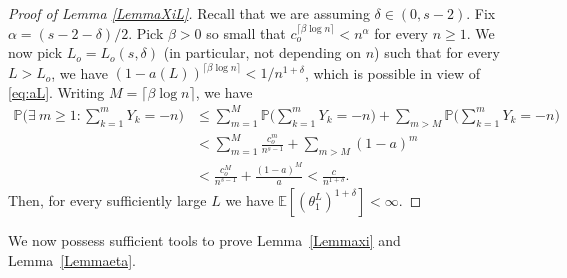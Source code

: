 \documentclass[a4paper,oneside,12pt]{amsart}
\renewcommand{\leq}{\leqslant}
\renewcommand{\geq}{\geqslant}
\newcommand{\E}{\mathbb{E}}
\theoremstyle{plain}
\theoremstyle{definition}
\theoremstyle{remark}
\renewcommand{\P}{\mathbb{P}}
\begin{document}
\begin{proof}[Proof of Lemma \ref{LemmaXiL}]
Recall that we are assuming $\delta \in (0,s-2)$.
Fix $\alpha = (s-2-\delta)/2$. 
Pick $\beta > 0$ so small that $c_o^{\lceil \beta \log n \rceil} < n^{\alpha}$ for every $n \geq 1$.
We now pick $L_o = L_o(s,\delta)$ (in particular, not depending on $n$) such that for every $L> L_o$, we have $(1-a(L))^{\lceil \beta \log n \rceil} < 1/n^{1+\delta}$, which is possible in view of \eqref{eq:aL}.
Writing $M = \lceil \beta \log n \rceil$, we have
\begin{equation}
\begin{split}
 \P\Big(\exists~ m \geq 1  \colon \sum_{k=1}^m Y_k = -n \Big)
&\leq \sum_{m = 1}^{M} \P\Big( \sum_{k=1}^m Y_k = -n  \Big) + \sum_{m > M} \P\Big( \sum_{k=1}^m Y_k =- n  \Big) \\
&< \sum_{m = 1}^{M}  \frac{c_o^m}{n^{s-1}} + \sum_{m > M} (1-a)^m \\
& < \frac{c_o^{M}}{n^{s-1}} + \frac{ (1-a)^{M} }{a} < \frac{c}{n^{1+\delta}}.
\end{split}
\end{equation}
Then, for every sufficiently large $L$ we have
$\E[(\theta^L_1)^{1+\delta}] < \infty.$
\end{proof}

We now possess sufficient tools to prove Lemma~\ref{Lemmaxi} and Lemma~\ref{Lemmaeta}.
\end{document}
